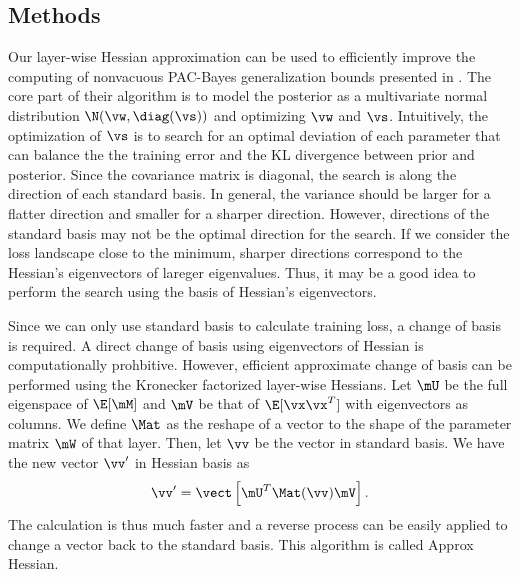 \label{sec:pac}


\subsection{Methods}
Our layer-wise Hessian approximation can be used to efficiently improve the computing of nonvacuous PAC-Bayes generalization bounds presented in \citet{dziugaite2017computing}. The core part of their algorithm is to model the posterior as a multivariate normal distribution $\N(\vw, \diag(\vs))$ and optimizing $\vw$ and $\vs$. Intuitively, the optimization of $\vs$ is to search for an optimal deviation of each parameter that can balance the the training error and the KL divergence between prior and posterior. Since the covariance matrix is diagonal, the search is along the direction of each standard basis. In general, the variance should be larger for a flatter direction and smaller for a sharper direction. However, directions of the standard basis may not be the optimal direction for the search. If we consider the loss landscape close to the minimum, sharper directions correspond to the Hessian's eigenvectors of lareger eigenvalues.  Thus, it may be a good idea to perform the search using the basis of Hessian's eigenvectors.

Since we can only use standard basis to calculate training loss, a change of basis is required. A direct change of basis using eigenvectors of Hessian is computationally prohbitive. However, efficient approximate change of basis can be performed using the Kronecker factorized layer-wise Hessians. Let $\mU$ be the full eigenspace of $\E[\mM]$ and $\mV$ be that of $\E[\vx\vx^T]$ with eigenvectors as columns. We define $\Mat$ as the reshape of a vector to the shape of the parameter matrix $\mW$ of that layer. Then, let $\vv$ be the vector in standard basis. We have the new vector $\vv'$ in Hessian basis as
\begin{equation}
    \vv' = \vect\left[\mU^T\Mat(\vv)\mV\right].
\end{equation}
The calculation is thus much faster and a reverse process can be easily applied to change a vector back to the standard basis. This algorithm is called Approx Hessian.

